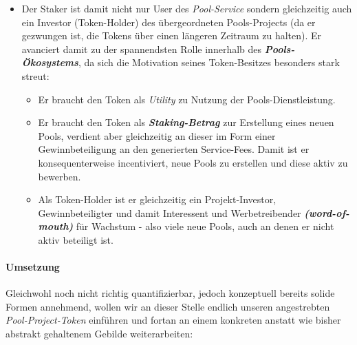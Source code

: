 \begin{Konzept}
\begin{itemize}
	\item Der Staker ist damit nicht nur User des \textit{Pool-Service} sondern gleichzeitig auch ein Investor (Token-Holder) des übergeordneten Pools-Projects (da er gezwungen ist, die Tokens über einen längeren Zeitraum zu halten). Er avanciert damit zu der spannendsten Rolle innerhalb des \textbf{\textit{Pools-Ökosystems}}, da sich die Motivation seines Token-Besitzes besonders stark streut:
	\begin{itemize}
		\item Er braucht den Token als \textit{Utility} zu Nutzung der Pools-Dienstleistung.
		\item Er braucht den Token als \textbf{\textit{Staking-Betrag}} zur Erstellung eines neuen Pools, verdient aber gleichzeitig an dieser im Form einer Gewinnbeteiligung an den generierten Service-Fees. Damit ist er konsequenterweise incentiviert, neue Pools zu erstellen und diese aktiv zu bewerben.
		\item Als Token-Holder ist er gleichzeitig ein Projekt-Investor, Gewinnbeteiligter und damit Interessent und Werbetreibender \textbf{\textit{(word-of-mouth)}} für Wachs\-tum - also viele neue Pools, auch an denen er nicht aktiv beteiligt ist.
	\end{itemize}
\end{itemize}

\end{Konzept}

\vspace{0.5cm}



\paragraph{Umsetzung}
\textbf{ }
\vspace{0.3cm}

Gleichwohl noch nicht richtig quantifizierbar, jedoch konzeptuell bereits solide Formen annehmend, wollen wir an dieser Stelle endlich unseren angestrebten \textit{Pool-Project-Token} einführen und fortan an einem konkreten anstatt wie bisher abstrakt gehaltenem Gebilde weiterarbeiten:

\vspace{0.3cm}

